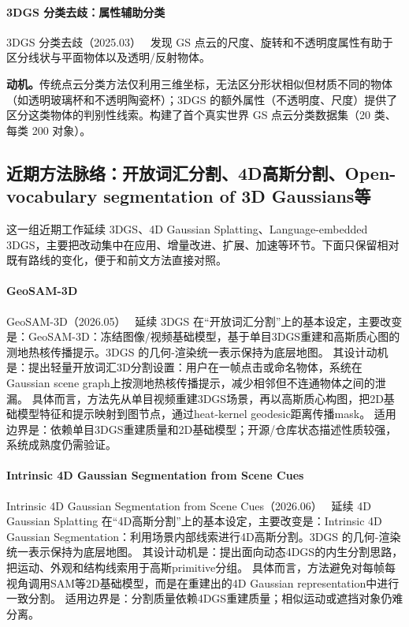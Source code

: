 \paragraph{3DGS 分类去歧：属性辅助分类} 3DGS 分类去歧（2025.03）~\cite{2503_08352} 发现 GS 点云的尺度、旋转和不透明度属性有助于区分线状与平面物体以及透明/反射物体。

\textbf{动机。}传统点云分类方法仅利用三维坐标，无法区分形状相似但材质不同的物体（如透明玻璃杯和不透明陶瓷杯）；3DGS 的额外属性（不透明度、尺度）提供了区分这类物体的判别性线索。构建了首个真实世界 GS 点云分类数据集（20 类、每类 200 对象）。


\subsection{近期方法脉络：开放词汇分割、4D高斯分割、Open-vocabulary segmentation of 3D Gaussians等}

这一组近期工作延续 3DGS、4D Gaussian Splatting、Language-embedded 3DGS，主要把改动集中在应用、增量改进、扩展、加速等环节。下面只保留相对既有路线的变化，便于和前文方法直接对照。

\paragraph{GeoSAM-3D}
GeoSAM-3D（2026.05）~\cite{2606_00447} 延续 3DGS 在“开放词汇分割”上的基本设定，主要改变是：GeoSAM-3D：冻结图像/视频基础模型，基于单目3DGS重建和高斯质心图的测地热核传播提示。3DGS 的几何-渲染统一表示保持为底层地图。
其设计动机是：提出轻量开放词汇3D分割设置：用户在一帧点击或命名物体，系统在Gaussian scene graph上按测地热核传播提示，减少相邻但不连通物体之间的泄漏。
具体而言，方法先从单目视频重建3DGS场景，再以高斯质心构图，把2D基础模型特征和提示映射到图节点，通过heat-kernel geodesic距离传播mask。
适用边界是：依赖单目3DGS重建质量和2D基础模型；开源/仓库状态描述性质较强，系统成熟度仍需验证。

\paragraph{Intrinsic 4D Gaussian Segmentation from Scene Cues}
Intrinsic 4D Gaussian Segmentation from Scene Cues（2026.06）~\cite{2606_18623} 延续 4D Gaussian Splatting 在“4D高斯分割”上的基本设定，主要改变是：Intrinsic 4D Gaussian Segmentation：利用场景内部线索进行4D高斯分割。3DGS 的几何-渲染统一表示保持为底层地图。
其设计动机是：提出面向动态4DGS的内生分割思路，把运动、外观和结构线索用于高斯primitive分组。
具体而言，方法避免对每帧每视角调用SAM等2D基础模型，而是在重建出的4D Gaussian representation中进行一致分割。
适用边界是：分割质量依赖4DGS重建质量；相似运动或遮挡对象仍难分离。

